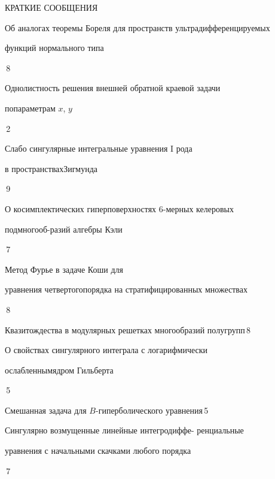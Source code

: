 \bigskip


{\centerline {КРАТКИЕ СООБЩЕНИЯ}}


\bigskip
















{Об аналогах теоремы Бореля для пространств ультрадифференцируемых \newline


функций нормального типа}{\No\,8}




{Однолистность решения внешней обратной краевой задачи  


по\newline параметрам $x$, $y$}{\No\,2}




{Слабо сингулярные интегральные уравнения I рода


в пространствах\newline Зигмунда}{\No\,9}




{О косимплектических гиперповерхностях $6$-мерных келеровых


подмногооб-\newline разий алгебры Кэли}{\No\,7}




{Метод Фурье в задаче Коши для 


уравнения четвертого\newline порядка на стратифицированных множествах}{\No\,8}




{Квазитождества в модулярных решетках многообразий полугрупп}{\No\,8}




{О свойствах сингулярного интеграла с логарифмически


ослабленным\newline ядром Гильберта}{\No\,5}




{Смешанная задача для $B$-гиперболического уравнения}{\No\,5}




{Сингулярно возмущенные линейные интегродиффе- \newline ренциальные


уравнения с начальными скачками любого порядка}{\No\,7}


